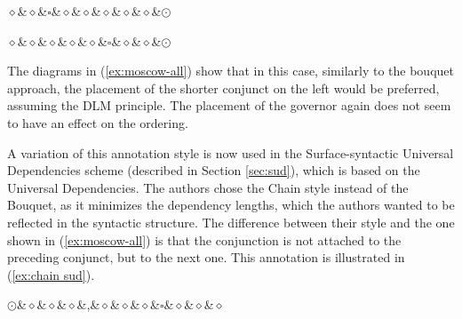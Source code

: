 \begin{multicols}{2}
\begin{exe}
\begin{xlist}
\ex
\begin{dependency}[theme = simple]
    \begin{deptext}
        $\diamond$\&$\diamond$\&$\square$\&$\diamond$\&$\diamond$\&$\diamond$\&$\diamond$\&$\diamond$\&$\odot$\\
    \end{deptext}
\end{dependency}

\ex
\begin{dependency}[theme = simple]
    \begin{deptext}
        $\diamond$\&$\diamond$\&$\diamond$\&$\diamond$\&$\diamond$\&$\square$\&$\diamond$\&$\diamond$\&$\odot$\\
    \end{deptext}

\end{dependency}
\end{xlist}
\end{exe}
\end{multicols}

The diagrams in (\ref{ex:moscow-all}) show that in this case, similarly to the bouquet approach, the placement of the shorter conjunct on the left would be preferred, assuming the DLM principle. The placement of the governor again does not seem to have an effect on the ordering. 

A variation of this annotation style is now used in the Surface-syntactic Universal Dependencies scheme (described in Section \ref{sec:sud}), which is based on the Universal Dependencies. The authors chose the Chain style instead of the Bouquet, as it minimizes the dependency lengths, which the authors wanted to be reflected in the syntactic structure. The difference between their style and the one shown in (\ref{ex:moscow-all}) is that the conjunction is not attached to the preceding conjunct, but to the next one. This annotation is illustrated in (\ref{ex:chain sud}). 

\begin{exe}
    \ex
    \label{ex:chain sud}
    \begin{Center}
    \begin{dependency}[theme = simple]
            \begin{deptext}
    $\odot$\&$\diamond$\&$\diamond$\&$\diamond$\&,\&$\diamond$\&$\diamond$\&$\diamond$\&$\square$\&$\diamond$\&$\diamond$\&$\diamond$\\
            \end{deptext}
        \end{dependency}
\end{Center}
\end{exe}
